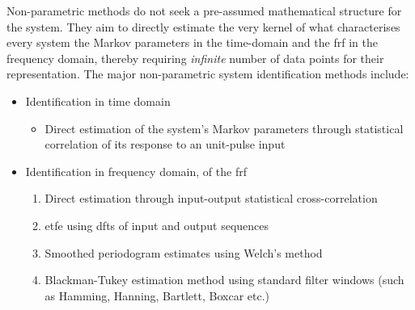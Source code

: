 Non-parametric methods do not seek a pre-assumed mathematical structure for the
 system. They  aim to directly  estimate the  very kernel of  what characterises
 every system \viz{} the Markov parameters  in the time-domain and the \gls{frf}
 in  the frequency  domain,  thereby requiring  \emph{infinite}  number of  data
 points for their representation. The major non-parametric system identification
 methods include:
 \begin{itemize}[topsep=0pt]
     \item Identification in time domain
         \begin{itemize}

             \item Direct  estimation of the system's  Markov parameters through
             statistical correlation of its response to an unit-pulse input

         \end{itemize}
     \item Identification in frequency domain,  \ie{} of the \gls{frf}
         \begin{enumerate}

             \item   Direct   estimation    through   input-output   statistical
             cross-correlation

             \item  \gls{etfe} using \glspl{dft} of input and output sequences

             \item  Smoothed periodogram estimates using Welch's method

             \item  Blackman-Tukey  estimation   method  using  standard  filter
             windows (such as Hamming, Hanning, Bartlett, Boxcar etc.)

         \end{enumerate}
 \end{itemize}



